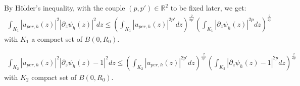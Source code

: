 \documentclass[leqno,11pt,letterpaper, english]{amsart}
\theoremstyle{plain}
\theoremstyle{definition}
\numberwithin{equation}{section}
\begin{document}

 By Hölder's inequality, with the couple $(p, p') \in \mathbb{R}^2$ to be fixed later, we get:
	\begin{align}
		 \int_{K_1} \left|u_{per,h}\left(z\right)\right|^2\left|\partial_z \psi_h\left(z\right)\right|^2dz
		\leq \left(\int_{K_1} |u_{per,h}(z)|^{2p'}dz\right)^{\frac{2}{2p'}}\left(\int_{K_1} \left|	\partial_z \psi_h \left(z\right)\right|^{2p}dz\right)^{\frac{2}{2p}}
	\end{align}
with $K_1$ a compact set of $B(0,R_0)$.

	\begin{align}
		\label{eq: Holder sur A1}
		\int_{K_2} |u_{per,h}(z)|^2\left|\partial_z \psi_h \left(z\right)-1\right|^2dz
		\leq \left(\int_{K_2} |u_{per,h}(z)|^{2p'}dz\right)^{\frac{2}{2p'}}\left(\int_{K_2} \left|\partial_z \psi_h \left(z\right)-1\right|^{2p}dz \right)^{\frac{2}{2p}}
	\end{align}
with $K_2$  compact set of $B(0,R_0)$.
\end{document}
